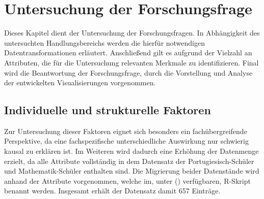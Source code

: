 \chapter[Untersuchung der Forschungsfrage]{Untersuchung der Forschungsfrage}

Dieses Kapitel dient der Untersuchung der Forschungsfragen. 
In Abhängigkeit des untersuchten Handlungsbereichs werden die hierfür notwendigen Datentransformationen erläutert. 
Anschließend gilt es aufgrund der Vielzahl an Attributen, die für die Untersuchung relevanten Merkmale zu identifizieren. 
Final wird die Beantwortung der Forschungsfrage, durch die Vorstellung und Analyse der entwickelten Visualisierungen vorgenommen.

\section{Individuelle und strukturelle Faktoren}

Zur Untersuchung dieser Faktoren eignet sich besonders ein fachübergreifende Perspektive, da eine fachspezifische unterschiedliche Auswirkung nur schwierig kausal zu erklären ist.
Im Weiteren wird dadurch eine Erhöhung der Datenmenge erzielt, da alle Attribute vollständig in dem Datensatz der Portugiesisch-Schüler und Mathematik-Schüler enthalten sind.
Die Migrierung beider Datenstände wird anhand der Attribute vorgenommen, welche im, unter (\cite[]{student_performance}) verfügbaren, R-Skript benannt werden.
Insgesamt erhält der Datensatz damit 657 Einträge. 

